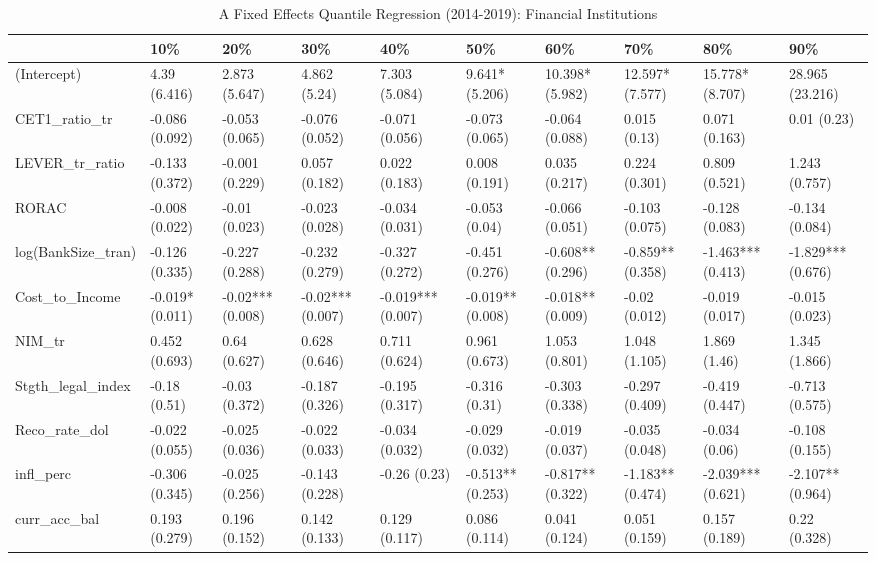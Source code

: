 \begin{table}[ht]
\centering
\caption{A Fixed Effects Quantile Regression (2014-2019): Financial Institutions} 
\begingroup\small
\begin{tabular}{llllllllll}
  \toprule
 & 10\% & 20\% & 30\% & 40\% & 50\% & 60\% & 70\% & 80\% & 90\% \\ 
  \midrule
(Intercept) & 4.39 (6.416) & 2.873 (5.647) & 4.862 (5.24) & 7.303 (5.084) & 9.641* (5.206) & 10.398* (5.982) & 12.597* (7.577) & 15.778* (8.707) & 28.965 (23.216) \\ 
  CET1\_ratio\_tr & -0.086 (0.092) & -0.053 (0.065) & -0.076 (0.052) & -0.071 (0.056) & -0.073 (0.065) & -0.064 (0.088) & 0.015 (0.13) & 0.071 (0.163) & 0.01 (0.23) \\ 
  LEVER\_tr\_ratio & -0.133 (0.372) & -0.001 (0.229) & 0.057 (0.182) & 0.022 (0.183) & 0.008 (0.191) & 0.035 (0.217) & 0.224 (0.301) & 0.809 (0.521) & 1.243 (0.757) \\ 
  RORAC & -0.008 (0.022) & -0.01 (0.023) & -0.023 (0.028) & -0.034 (0.031) & -0.053 (0.04) & -0.066 (0.051) & -0.103 (0.075) & -0.128 (0.083) & -0.134 (0.084) \\ 
  log(BankSize\_tran) & -0.126 (0.335) & -0.227 (0.288) & -0.232 (0.279) & -0.327 (0.272) & -0.451 (0.276) & -0.608** (0.296) & -0.859** (0.358) & -1.463*** (0.413) & -1.829*** (0.676) \\ 
  Cost\_to\_Income & -0.019* (0.011) & -0.02*** (0.008) & -0.02*** (0.007) & -0.019*** (0.007) & -0.019** (0.008) & -0.018** (0.009) & -0.02 (0.012) & -0.019 (0.017) & -0.015 (0.023) \\ 
  NIM\_tr & 0.452 (0.693) & 0.64 (0.627) & 0.628 (0.646) & 0.711 (0.624) & 0.961 (0.673) & 1.053 (0.801) & 1.048 (1.105) & 1.869 (1.46) & 1.345 (1.866) \\ 
  Stgth\_legal\_index & -0.18 (0.51) & -0.03 (0.372) & -0.187 (0.326) & -0.195 (0.317) & -0.316 (0.31) & -0.303 (0.338) & -0.297 (0.409) & -0.419 (0.447) & -0.713 (0.575) \\ 
  Reco\_rate\_dol & -0.022 (0.055) & -0.025 (0.036) & -0.022 (0.033) & -0.034 (0.032) & -0.029 (0.032) & -0.019 (0.037) & -0.035 (0.048) & -0.034 (0.06) & -0.108 (0.155) \\ 
  infl\_perc & -0.306 (0.345) & -0.025 (0.256) & -0.143 (0.228) & -0.26 (0.23) & -0.513** (0.253) & -0.817** (0.322) & -1.183** (0.474) & -2.039*** (0.621) & -2.107** (0.964) \\ 
  curr\_acc\_bal & 0.193 (0.279) & 0.196 (0.152) & 0.142 (0.133) & 0.129 (0.117) & 0.086 (0.114) & 0.041 (0.124) & 0.051 (0.159) & 0.157 (0.189) & 0.22 (0.328) \\ 

\end{tabular}
\end{table}
